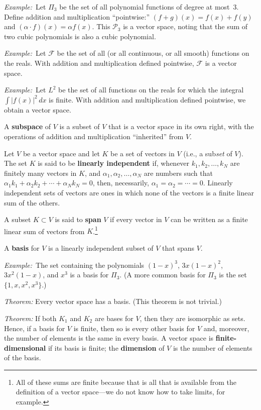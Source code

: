 \documentclass[10pt, a4paper, twocolumn]{article}
\newcommand{\defn}[1]{\textbf{#1}}
\newcommand{\eg}{\emph{Example:}\relax}
\begin{document}
\eg\ Let $\Pi_3$ be the set of all polynomial functions of degree at most~3. Define addition and
multiplication “pointwise:” $(f + g)(x) = f(x) + f(y)$ and $(\alpha \cdot f)(x) = \alpha f(x)$. This $\mathcal{P}_3$ is a vector
space, noting that the sum of two cubic polynomials is also a cubic polynomial.

\eg\ Let $\mathcal{F}$ be the set of all (or all continuous, or all smooth) functions on the reals. With
addition and multiplication defined pointwise, $\mathcal{F}$ is a vector space.

\eg\ Let $L^2$ be the set of all functions on the reals for which the integral $\int |f(x)|^2\,dx$
is finite. With addition and multiplication defined pointwise, we obtain a vector space.  

A \defn{subspace} of $V$ is a subset of $V$ that is a vector space in its own right, with the
operations of addition and multiplication “inherited” from $V$.

Let $V$ be a vector space and let $K$ be a set of vectors in $V$ (i.e., a sub\emph{set} of $V$). The
set $K$ is said to be \defn{linearly independent} if, whenever $k_1, k_2, \dotsc, k_N$ are finitely
many vectors in $K$, and $\alpha_1, \alpha_2, \dotsc, \alpha_N$ are numbers such that $\alpha_1 k_1 + \alpha_2 k_2 + \dotsb +
\alpha_N k_N = 0$, then, necessarily, $\alpha_1 = \alpha_2 = \dotsb = 0$. Linearly independent sets of vectors are
ones in which none of the vectors is a finite linear sum of the others.

A subset $K \subset V$ is said to \defn{span} $V$ if every vector in $V$ can be written as a finite linear sum
of vectors from $K$.\footnote{All of these sums are finite because that is all that is available from
  the definition of a vector space---we do not know how to take limits, for example.}

A \defn{basis} for $V$ is a linearly independent subset of $V$ that spans $V$. 

\eg\ The set containing the polynomials $(1-x)^3$, $3x(1-x)^2$, $3x^2(1-x)$, and $x^3$ is a
basis for $\Pi_3$. (A more common basis for $\Pi_3$ is the set $\{1, x, x^2, x^3\}$.) 

\emph{Theorem:} Every vector space has a basis. (This theorem is not trivial.)

\emph{Theorem:} If both $K_1$ and $K_2$ are bases for $V$, then they are isomorphic as sets. Hence, if
a basis for $V$ is finite, then so is every other basis for $V$ and, moreover, the number of elements
is the same in every basis. A vector space is \defn{finite-dimensional} if its basis is finite; the
\defn{dimension} of $V$ is the number of elements of the basis.   
\end{document}
